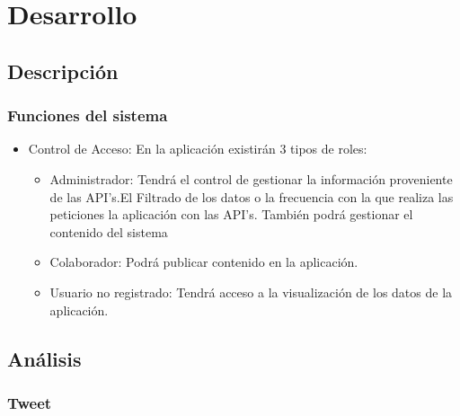 
\chapter{Desarrollo}

\section{Descripción}

\subsection{Funciones del sistema}



\vspace{5 mm}

\begin{itemize}

\item Control de Acceso: En la aplicación existirán 3 tipos de roles:

\begin{itemize}
\item Administrador: Tendrá el control de gestionar la información proveniente de las API's.El Filtrado de los datos o la frecuencia con la que realiza las peticiones la aplicación con las API's.
También podrá gestionar el contenido del sistema
\item Colaborador: Podrá publicar contenido en la aplicación.
\item Usuario no registrado: Tendrá acceso a la visualización de los datos de la aplicación. 
\end{itemize}

\end{itemize}

\section{Análisis}


\subsection{Tweet}

